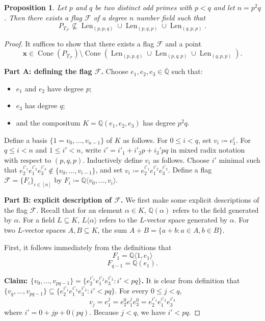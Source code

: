 \documentclass[letterpaper,10pt]{amsart}
\DeclareMathOperator{\Len}{Len}
\DeclareMathOperator{\Cone}{Cone}
\newcommand{\QQ}{\mathbb{Q}}      %
\newcommand{\la}{\langle}
\newcommand{\ra}{\rangle}
\newcommand{\cF}{\mathcal{F}}
\newtheorem{proposition}[theorem]{Proposition}
\theoremstyle{definition}
\theoremstyle{remark}
\begin{document}
\begin{proposition}
\label{lem:p2q}
Let $p$ and $q$ be two distinct odd primes with $p < q$ and let $n = p^2q$. Then there exists a flag $\cF$ of a degree $n$ number field such that 
\[
	P_{T_{\cF}} \not \subseteq \Len_{(p,p,q)} \cup \Len_{(p,q,p)} \cup \Len_{(q,p,p)}.
\]
\end{proposition}
\begin{proof}

It suffices to show that there exists a flag $\cF$ and a point
\[
	\mathbf{x} \in \Cone(P_{T_{\cF}}) \setminus \Cone( \Len_{(p,p,q)} \cup \Len_{(p,q,p)} \cup \Len_{(q,p,p)}).
\] 

\noindent \textbf{Part A: defining the flag $\cF$.} Choose $e_1,e_2,e_3 \in \overline{\QQ}$ such that:
\begin{itemize}
    \item $e_1$ and $e_2$ have degree $p$;
    \item $e_3$ has degree $q$;
    \item and the compositum $K = \QQ(e_1,e_2,e_3)$ has degree $p^2q$.
\end{itemize}
Define a basis $\{1=v_0,\dots,v_{n - 1}\}$ of $K$ as follows. For $0 \leq i < q$, set $v_i \coloneqq e_1^{i}$. For $q \leq i < n$ and $1 \leq i' < n$, write $i' = i'_1 + i'_2p + i_3'pq$ in mixed radix notation with respect to $(p,q,p)$. 
Inductively define $v_i$ as follows. Choose $i'$ minimal such that $e_2^{i'_1}e_1^{i'_2}e_3^{i'_3} \notin \{v_0,\dots,v_{i-1}\}$, and set $v_i \coloneqq e_2^{i'_1}e_1^{i'_2}e_3^{i'_3}$. Define a flag $\cF = \{F_i\}_{i \in [n]}$ by $F_i \coloneqq \QQ \la v_0,\dots,v_i \ra$.

\noindent \textbf{Part B: explicit description of $\cF$.}
We first make some explicit descriptions of the flag $\cF$. Recall that for an element $\alpha \in K$, $\QQ(\alpha)$ refers to the field generated by $\alpha$. For a field $L \subseteq K$, $L \la \alpha\ra$ refers to the $L$-vector space generated by $\alpha$. For two $L$-vector spaces $A,B \subseteq K$, the sum $A + B = \{a + b : a \in A, b \in B\}$.

First, it follows immediately from the definitions that
\begin{equation}
\label{eqn:p2q-f1}
F_1  = \QQ \la  1, e_1 \ra
\end{equation}
\begin{equation}
\label{eqn:p2q-fq-1}
F_{q-1} = \QQ(e_1).
\end{equation}

\noindent \textbf{Claim: $\{v_0,\dots,v_{pq-1}\} = \{e_2^{i'_1}e_1^{i'_2}e_3^{i'_3} : i' < pq\}$.} It is clear from definition that $\{v_{q},\dots,v_{pq-1}\} \subseteq \{e_2^{i'_1}e_1^{i'_2}e_3^{i'_3} : i' < pq\}$. For every $0 \leq j < q$,
\[
    v_j = e_1^j = e_2^{0}e_1^{j}e_3^{0} = e_2^{i'_1}e_1^{i'_2}e_3^{i'_3}
\]
where $i' = 0 + jp + 0(pq)$. Because $j < q$, we have $i' < pq$.


\end{proof}
\end{document}
